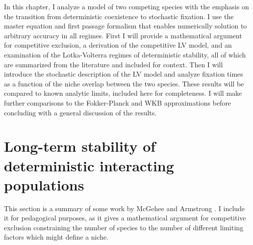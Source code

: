 In this chapter, I analyze a model of two competing species with the emphasis on the transition from deterministic coexistence to stochastic fixation. %
I use the master equation and first passage formalism that enables numerically solution to arbitrary accuracy in all regimes. %
First I will provide a mathematical argument for competitive exclusion, a derivation of the competitive LV model, and an examination of the Lotka-Volterra regimes of deterministic stability, all of which are summarized from the literature and included for context. 
Then I will introduce the stochastic description of the LV model and analyze fixation times as a function of the niche overlap between the two species. 
These results will be compared to known analytic limits, included here for completeness. 
I will make further comparisons to the Fokker-Planck and WKB approximations before concluding with a general discussion of the results. 


\section{Long-term stability of deterministic interacting populations}

This section is a summary of some work by McGehee and Armstrong \cite{Armstrong1976,McGehee1977a,Armstrong1980}. 
I include it for pedagogical purposes, as it gives a mathematical argument for competitive exclusion constraining the number of species to the number of different limiting factors which might define a niche. 

